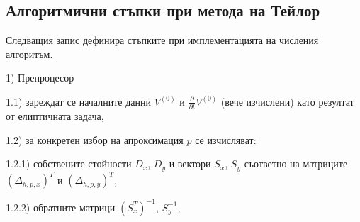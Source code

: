 \documentclass{article}
\begin{document}
\subsection{Алгоритмични стъпки при метода на Тейлор}

Следващия запис дефинира стъпките при имплементацията на числения алгоритъм.
\par
1) Препроцесор
\par
1.1) зареждат се началните данни $V^{(0)}$ и $\frac{\partial}{\partial t} V^{(0)}$ (вече изчислени) като резултат от елиптичната задача,
\par
1.2) за конкретен избор на апроксимация $p$ се изчисляват:
\par
1.2.1) собствените стойности $D_x$, $D_y$ и вектори $S_x$, $S_y$ съответно на матриците $(\Delta_{h,p,x})^T$ и $(\Delta_{h,p,y})^T$, 
\par
1.2.2) обратните матрици $(S_x^T)^{-1}$, $S_y^{-1}$,
\\
\end{document}
